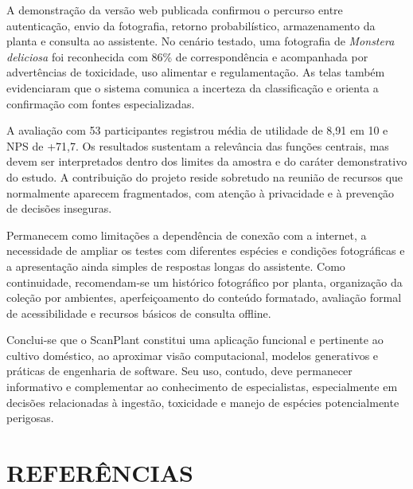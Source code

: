\documentclass[12pt,a4paper]{article}
\begin{document}
A demonstração da versão web publicada confirmou o percurso entre autenticação, envio da fotografia, retorno probabilístico, armazenamento da planta e consulta ao assistente. No cenário testado, uma fotografia de \textit{Monstera deliciosa} foi reconhecida com 86\% de correspondência e acompanhada por advertências de toxicidade, uso alimentar e regulamentação. As telas também evidenciaram que o sistema comunica a incerteza da classificação e orienta a confirmação com fontes especializadas.

A avaliação com 53 participantes registrou média de utilidade de 8,91 em 10 e NPS de +71,7. Os resultados sustentam a relevância das funções centrais, mas devem ser interpretados dentro dos limites da amostra e do caráter demonstrativo do estudo. A contribuição do projeto reside sobretudo na reunião de recursos que normalmente aparecem fragmentados, com atenção à privacidade e à prevenção de decisões inseguras.

Permanecem como limitações a dependência de conexão com a internet, a necessidade de ampliar os testes com diferentes espécies e condições fotográficas e a apresentação ainda simples de respostas longas do assistente. Como continuidade, recomendam-se um histórico fotográfico por planta, organização da coleção por ambientes, aperfeiçoamento do conteúdo formatado, avaliação formal de acessibilidade e recursos básicos de consulta offline.

Conclui-se que o ScanPlant constitui uma aplicação funcional e pertinente ao cultivo doméstico, ao aproximar visão computacional, modelos generativos e práticas de engenharia de software. Seu uso, contudo, deve permanecer informativo e complementar ao conhecimento de especialistas, especialmente em decisões relacionadas à ingestão, toxicidade e manejo de espécies potencialmente perigosas.

\FloatBarrier

\section*{REFERÊNCIAS}
\end{document}
